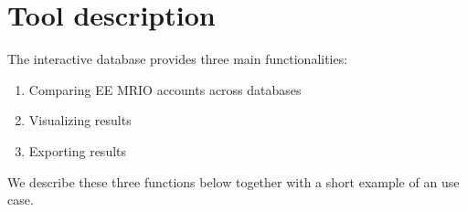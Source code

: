 \section{Tool description}

The interactive database provides three main functionalities:

\begin{enumerate}
\item Comparing EE MRIO accounts across databases
\item Visualizing results
\item Exporting results
\end{enumerate}

We describe these three functions below together with a short example of an use case.

